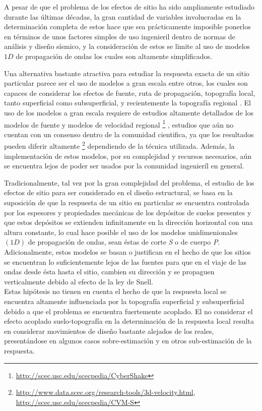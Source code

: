 \documentclass[spanish,letterpaper,12pt,twoside,openany]{article}
\begin{document}
A pesar de que el problema de los efectos de sitio ha sido ampliamente estudiado durante las últimas décadas, la gran cantidad de variables involucradas en la determinación completa de estos hace que sea prácticamente imposible ponerlos en términos de unos factores simples de uso ingenieril dentro de normas de análisis y diseño sísmico, y la consideración de estos se limite al uso de modelos $1D$ de propagación de ondas los cuales son altamente simplificados.

Una alternativa bastante atractiva para estudiar la respuesta exacta de un sitio particular parece ser el uso de modelos a gran escala \citep[por ejemplo][]{Bielak2005, Lee2009a, Lee2009b, Ma2007, Cupillard2012} entre otros, los cuales son capaces de considerar los efectos de fuente, ruta de propagación, topografía local, tanto superficial como subsuperficial, y recientemente la topografía regional \citep{Doriam2014}. El uso de los modelos a gran escala requiere de estudios altamente detallados de los modelos de fuente y modelos de velocidad regional \footnote{\url{http://scec.usc.edu/scecpedia/CyberShake}}  \citep{Graves2011}, estudios que aún no cuentan con un consenso dentro de la comunidad cientifica, ya que los resultados pueden diferir altamente \footnote{\url{http://www.data.scec.org/research-tools/3d-velocity.html},\\	 \url{http://scec.usc.edu/scecpedia/CVM-S}} dependiendo de la técnica utilizada. Además, la implementación de estos modelos, por su complejidad y recursos necesarios, aún se encuentra lejos de poder ser usados por la comunidad ingenieríl en general.
%

Tradicionalmente, tal vez por la gran complejidad del problema, el estudio de los efectos de sitio para ser considerado en el diseño estructural, se basa en la suposición de que la respuesta de un sitio en particular se encuentra controlada por los espesores y propiedades mecánicas de los depósitos de suelos presentes y que estos depósitos se extienden infinitamente en la dirección horizontal con una altura constante, lo cual hace posible el uso de los modelos unidimenionales $\left( 1D \right)$ de propagación de ondas, sean éstas de corte \textit{S} o de cuerpo \textit{P}. Adicionalmente, estos modelos se basan o justifican en el hecho de que los sitios se encuentran lo suficientemente lejos de las fuentes para que en el viaje de las ondas desde ésta hasta el sitio, cambien su dirección y se propaguen verticalmente debido al efecto de la ley de Snell.\\
%
Estas hipótesis no tienen en cuenta el hecho de que la respuesta local se encuentra altamente influenciada por la topografía superficial y subsuperficial debido a que el problema se encuentra fuertemente acoplado. El no considerar el efecto acoplado suelo-topografía en la determinación de la respuesta local resulta en considerar movimientos de diseño bastante alejados de los reales, presentándose en algunos casos sobre-estimación y en otros sub-estimación de la respuesta.
\end{document}

